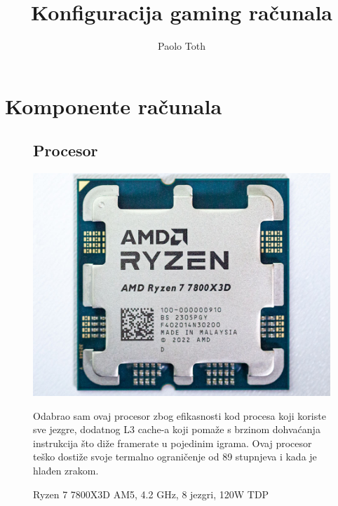 \documentclass{article}
\title{Konfiguracija gaming računala}
\author{Paolo Toth}
\begin{document}
\maketitle

\section{Komponente računala}

\begin{figure}[H]
\subsection{Procesor}
\centering
\includegraphics[scale=0.1]{Slike/cpu-front.jpg}
\caption{Ryzen 7 7800X3D AM5, 4.2 GHz, 8 jezgri, 120W TDP} 
Odabrao sam ovaj procesor zbog efikasnosti kod procesa koji koriste sve jezgre, dodatnog L3 cache-a koji pomaže s brzinom dohvaćanja instrukcija što diže framerate u pojedinim igrama. Ovaj procesor teško dostiže svoje termalno ograničenje od 89 stupnjeva i kada je hlađen zrakom.
\end{figure}
\end{document}
